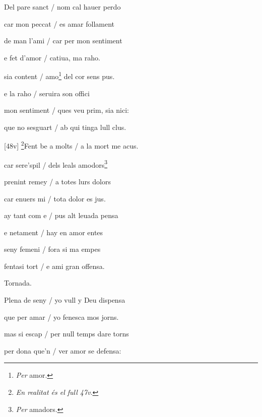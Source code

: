 \documentclass[12pt]{article}
\begin{document}
\begin{estrofa}

 Del pare sanct / nom cal hauer perdo

 car mon peccat / es amar follament

 de man l'ami / car per mon sentiment

 e fet d'amor / catiua, ma raho.

 sia content / amo\footnote{\textit{Per} amor.} del cor sens pus.

 e la raho / seruira son offici

 mon sentiment / ques veu prim, sia nici:

 que no sesguart / ab qui tinga lull clus.

\end{estrofa}



\begin{estrofa}

 [48v] \footnote{\textit{En realitat \'{e}s el full 47v}.}Fent be a molts / a la
mort me acus.

 car sere'spil / dels leals amodors\footnote{\textit{Per} amadors.}

 prenint remey / a totes lurs dolors

 car enuers mi / tota dolor es jus.

 ay tant com e / pus alt leuada pensa

 e netament / hay en amor entes

 seny femeni / fora si ma empes

 fentasi tort / e ami gran offensa.

\end{estrofa}


\begin{estrofaExtra}%




\begin{tornada}

Tornada.

\end{tornada}


\end{estrofaExtra}


\begin{estrofa}

 Plena de seny / yo vull y Deu dispensa

 que per amar / yo fenesca mos jorns.

 mas si escap / per null temps dare torns

 per dona que'n / ver amor se defensa:

\end{estrofa}
\end{document}

